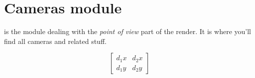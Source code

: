 % 

\chapter{Cameras module}

 is the module dealing with the \emph{point of view} part of the render.  It is where you'll find all cameras and related stuff.

\[
\left[\begin{array}{cc}
	d_1x & d_2x \\
	d_1y & d_2y
\end{array}\right]
\]